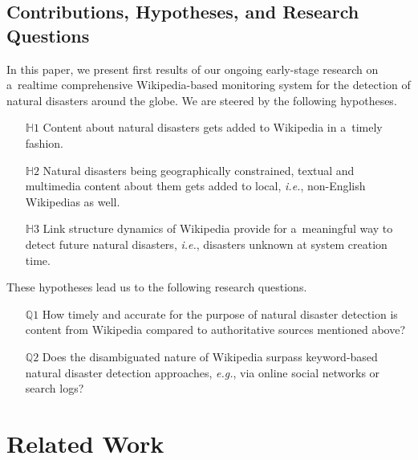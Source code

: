 \documentclass[runningheads,a4paper]{llncs}
\begin{document}
\subsection{Contributions, Hypotheses, and Research Questions}

In this paper, we present first results of
our ongoing early-stage research
on a~realtime comprehensive Wikipedia-based monitoring system
for the detection of natural disasters around the globe.
We are steered by the following hypotheses.

\begin{itemize}
  \itemsep0em
  \item[$\mathbb{H}1$] Content about natural disasters
    gets added to Wikipedia in a~timely fashion.
  \item[$\mathbb{H}2$] Natural disasters being geographically
    constrained, textual and multimedia content about them
    gets added to local, \emph{i.e.}, non-English Wikipedias as well.
  \item[$\mathbb{H}3$] Link structure dynamics of Wikipedia
    provide for a~meaningful way to detect future
    natural disasters, \emph{i.e.}, disasters unknown at system creation time.
\end{itemize}

\pagebreak \noindent These hypotheses lead us to the following research questions.

\begin{itemize}
  \itemsep0em
  \item[$\mathbb{Q}1$] How timely and accurate for the purpose
    of natural disaster detection is content from Wikipedia
    compared to authoritative sources mentioned above?
  \item[$\mathbb{Q}2$] Does the disambiguated nature of Wikipedia
    surpass keyword-based natural disaster detection approaches,
    \emph{e.g.}, via online social networks or search logs?
\end{itemize}

\section{Related Work}
\end{document}
